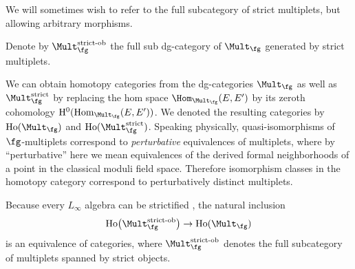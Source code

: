 We will sometimes wish to refer to the full subcategory of strict multiplets, but allowing arbitrary morphisms.
\begin{dfn}
	Denote by $\Mult_{\fg}^{\text{\rm strict-ob}}$ the full sub dg-category of $\Mult_{\fg}$ generated by strict multiplets.
\end{dfn}


We can obtain homotopy categories from the dg-categories $\Mult_{\fg}$ as well as $\Mult_{\fg}^{\mathrm{strict}}$ by replacing the hom space $\Hom_{\Mult_{\fg}}(E, E')$ by its zeroth cohomology $\mathrm H^0(\mathrm{Hom}_{\Mult_{\fg}}(E, E'))$. We denoted the resulting categories by $\mathrm{Ho}(\Mult_{\fg})$ and $\mathrm{Ho}(\Mult_{\fg}^{\mathrm{strict}})$. Speaking physically, quasi-isomorphisms of $\fg$-multiplets correspond to \emph{perturbative} equivalences of multiplets, where by ``perturbative'' here we mean equivalences of the derived formal neighborhoods of a point in the classical moduli field space. Therefore isomorphism classes in the homotopy category correspond to perturbatively distinct multiplets.


\begin{rmk}
	Because every $L_\infty$ algebra can be strictified \cite[Part II, Corollary 1.6]{KrizMay}, the natural inclusion
	\begin{equation*}
	\mathrm{Ho}\big(\Mult_{\fg}^{\text{\rm strict-ob}}\big) \to \mathrm{Ho}(\Mult_{\fg})
	\end{equation*}
	is an equivalence of categories, where $\Mult_{\fg}^{\text{\rm strict-ob}}$ denotes the full subcategory of multiplets spanned by strict objects.
\end{rmk}
